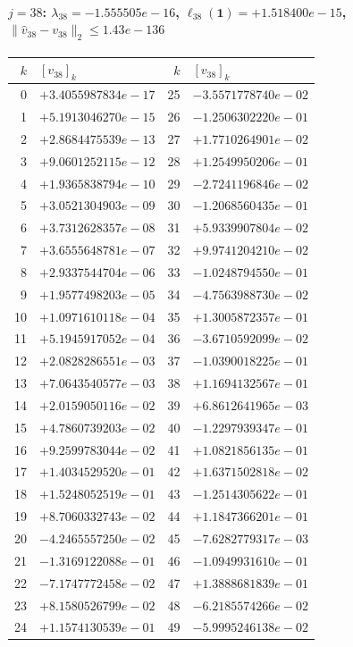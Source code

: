 \documentclass[11pt]{article}
\begin{document}
\paragraph{$j = 38$: $\lambda_{38} = -1.555505e-16$, \quad $\ell_{38}(\mathbf{1}) = +1.518400e-15$, \quad $\|\hat{v}_{38} - v_{38}\|_2 \leq 1.43e-136$}
\begin{center}
{\footnotesize
\begin{tabular}{r@{\;\;}l@{\quad}r@{\;\;}l}
\toprule
$k$ & $[v_{38}]_k$ & $k$ & $[v_{38}]_k$ \\
\midrule
0 & $+3.4055987834e-17$ & 25 & $-3.5571778740e-02$ \\
1 & $+5.1913046270e-15$ & 26 & $-1.2506302220e-01$ \\
2 & $+2.8684475539e-13$ & 27 & $+1.7710264901e-02$ \\
3 & $+9.0601252115e-12$ & 28 & $+1.2549950206e-01$ \\
4 & $+1.9365838794e-10$ & 29 & $-2.7241196846e-02$ \\
5 & $+3.0521304903e-09$ & 30 & $-1.2068560435e-01$ \\
6 & $+3.7312628357e-08$ & 31 & $+5.9339907804e-02$ \\
7 & $+3.6555648781e-07$ & 32 & $+9.9741204210e-02$ \\
8 & $+2.9337544704e-06$ & 33 & $-1.0248794550e-01$ \\
9 & $+1.9577498203e-05$ & 34 & $-4.7563988730e-02$ \\
10 & $+1.0971610118e-04$ & 35 & $+1.3005872357e-01$ \\
11 & $+5.1945917052e-04$ & 36 & $-3.6710592099e-02$ \\
12 & $+2.0828286551e-03$ & 37 & $-1.0390018225e-01$ \\
13 & $+7.0643540577e-03$ & 38 & $+1.1694132567e-01$ \\
14 & $+2.0159050116e-02$ & 39 & $+6.8612641965e-03$ \\
15 & $+4.7860739203e-02$ & 40 & $-1.2297939347e-01$ \\
16 & $+9.2599783044e-02$ & 41 & $+1.0821856135e-01$ \\
17 & $+1.4034529520e-01$ & 42 & $+1.6371502818e-02$ \\
18 & $+1.5248052519e-01$ & 43 & $-1.2514305622e-01$ \\
19 & $+8.7060332743e-02$ & 44 & $+1.1847366201e-01$ \\
20 & $-4.2465557250e-02$ & 45 & $-7.6282779317e-03$ \\
21 & $-1.3169122088e-01$ & 46 & $-1.0949931610e-01$ \\
22 & $-7.1747772458e-02$ & 47 & $+1.3888681839e-01$ \\
23 & $+8.1580526799e-02$ & 48 & $-6.2185574266e-02$ \\
24 & $+1.1574130539e-01$ & 49 & $-5.9995246138e-02$ \\
\bottomrule
\end{tabular}
}
\end{center}
\end{document}
